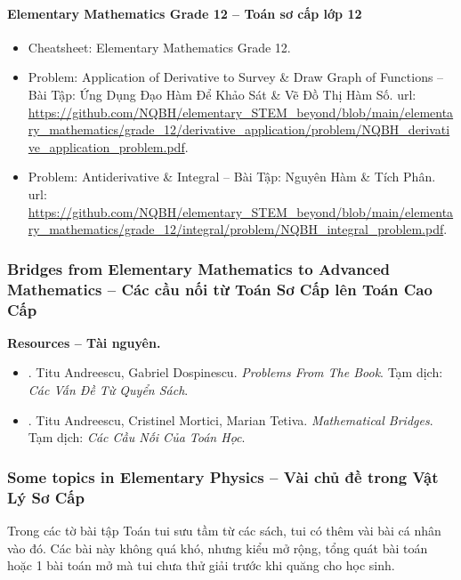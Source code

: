 \documentclass[12pt]{article}
\begin{document}
\paragraph{Elementary Mathematics Grade 12 -- Toán sơ cấp lớp 12}

\begin{itemize}
	\item Cheatsheet: Elementary Mathematics Grade 12.
	\item Problem: Application of Derivative to Survey \& Draw Graph of Functions -- Bài Tập: Ứng Dụng Đạo Hàm Để Khảo Sát \& Vẽ Đồ Thị Hàm Số. {\sc url}: \url{https://github.com/NQBH/elementary_STEM_beyond/blob/main/elementary_mathematics/grade_12/derivative_application/problem/NQBH_derivative_application_problem.pdf}.
	\item Problem: Antiderivative \& Integral -- Bài Tập: Nguyên Hàm \& Tích Phân. {\sc url}: \url{https://github.com/NQBH/elementary_STEM_beyond/blob/main/elementary_mathematics/grade_12/integral/problem/NQBH_integral_problem.pdf}.
\end{itemize}

\subsubsection{Bridges from Elementary Mathematics to Advanced Mathematics -- Các cầu nối từ Toán Sơ Cấp lên Toán Cao Cấp}
\textbf{\textsf{Resources -- Tài nguyên.}}
\begin{itemize}
	\item \cite{Andreescu_Dospinescu2010}. {\sf Titu Andreescu, Gabriel Dospinescu}. {\it Problems From The Book}. Tạm dịch: {\it Các Vấn Đề Từ Quyển Sách}.
	\item \cite{Andreescu_Mortici_Tetiva2017}. {\sf Titu Andreescu, Cristinel Mortici, Marian Tetiva}. {\it Mathematical Bridges}. Tạm dịch: {\it Các Cầu Nối Của Toán Học}.
\end{itemize}


\subsubsection{Some topics in Elementary Physics -- Vài chủ đề trong Vật Lý Sơ Cấp}
Trong các tờ bài tập Toán tui sưu tầm từ các sách, tui có thêm vài bài cá nhân vào đó. Các bài này không quá khó, nhưng kiểu mở rộng, tổng quát bài toán hoặc 1 bài toán mở mà tui chưa thử giải trước khi quăng cho học sinh.
\end{document}
